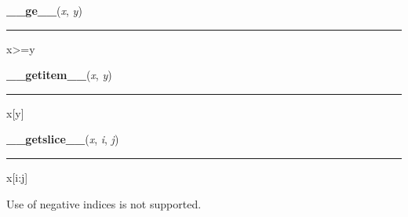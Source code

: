     \label{posix:stat_result:__ge__}

    \vspace{0.5ex}

\hspace{.8\funcindent}\begin{boxedminipage}{\funcwidth}

    \raggedright \textbf{\_\_ge\_\_}(\textit{x}, \textit{y})

    \vspace{-1.5ex}

    \rule{\textwidth}{0.5\fboxrule}
\setlength{\parskip}{2ex}
    x{\textgreater}=y

\setlength{\parskip}{1ex}
    \end{boxedminipage}

    \label{posix:stat_result:__getitem__}

    \vspace{0.5ex}

\hspace{.8\funcindent}\begin{boxedminipage}{\funcwidth}

    \raggedright \textbf{\_\_getitem\_\_}(\textit{x}, \textit{y})

    \vspace{-1.5ex}

    \rule{\textwidth}{0.5\fboxrule}
\setlength{\parskip}{2ex}
    x[y]

\setlength{\parskip}{1ex}
    \end{boxedminipage}

    \label{posix:stat_result:__getslice__}

    \vspace{0.5ex}

\hspace{.8\funcindent}\begin{boxedminipage}{\funcwidth}

    \raggedright \textbf{\_\_getslice\_\_}(\textit{x}, \textit{i}, \textit{j})

    \vspace{-1.5ex}

    \rule{\textwidth}{0.5\fboxrule}
\setlength{\parskip}{2ex}
    x[i:j]

    Use of negative indices is not supported.

\setlength{\parskip}{1ex}
    \end{boxedminipage}

